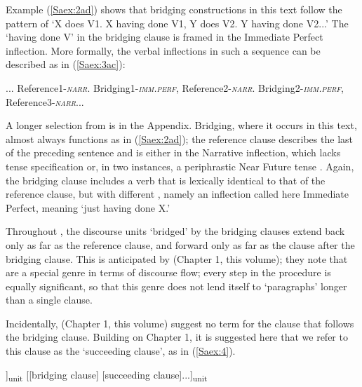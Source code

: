 \documentclass[output=paper]{LSP/langsci}
\begin{document}
Example (\ref{Saex:2ad}) shows that  bridging constructions in this text follow the pattern of `X does V1. X having done V1, Y does V2. Y having done V2...' The `having done V' in the bridging clause is framed in the Immediate Perfect inflection. More formally, the verbal inflections in such a sequence can be described as in (\ref{Saex:3ac}): 

\begin{exe}
\ex \label{Saex:3ac}
\begin{xlist}
\ex \label{Saex:3a}
\glt ... Reference1-\textit{\textsc{narr}}.
\ex \label{Saex:3b}
\glt Bridging1-\textit{\textsc{imm.perf}}, Reference2-\textit{\textsc{narr}}.
\ex \label{Saex:3c}
\glt Bridging2-\textit{\textsc{imm.perf}}, Reference3-\textit{\textsc{narr}}...
\end{xlist}
\end{exe}


A longer selection from \citet{Chesi2014} is in the Appendix. Bridging, where it occurs in this text, almost always functions as in (\ref{Saex:2ad}); the reference clause describes the last  of the preceding sentence and is either in the Narrative inflection, which lacks tense specification or, in two instances, a periphrastic Near Future tense \citep[see][]{Sarvasy2016}. Again, the bridging clause includes a verb that is lexically identical to that of the reference clause, but with different , namely an inflection called here Immediate Perfect, meaning `just having done X.'

Throughout \citet{Chesi2014}, the discourse units `bridged' by the bridging clauses extend back only as far as the reference clause, and forward only as far as the clause after the bridging clause. This is anticipated by \citeauthor{guerin18} (Chapter 1, this volume); they note that  are a special genre in terms of discourse flow; every step in the procedure is equally significant, so that this genre does not lend itself to `paragraphs' longer than a single clause. 

Incidentally, \citeauthor{guerin18} (Chapter 1, this volume) suggest no term for the clause that follows the bridging clause. Building on Chapter 1, it is suggested here that we refer to this clause as the `succeeding clause', as in (\ref{Saex:4}).

\begin{exe}
	\ex	\label{Saex:4}
		\glt	[... [reference clause]]\textsubscript{unit} [[bridging clause] [succeeding clause]...]\textsubscript{unit}
\end{exe}
\end{document}

